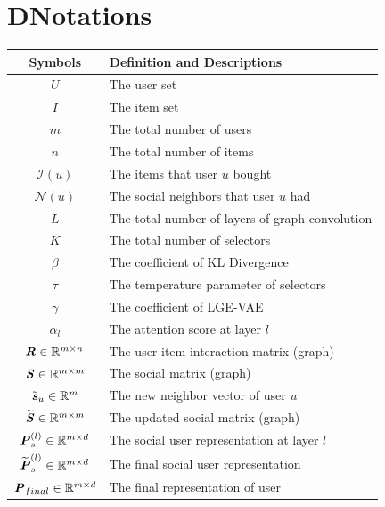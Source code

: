 \documentclass[letterpaper]{article} %
\begin{document}
\section{D{\quad}Notations}
\begin{table}[ht]
    \centering
    \begin{tabular}{c|p{6.0cm}}
        \hline
         Symbols &Definition and Descriptions \\ \hline\hline
         $U$    &The user set\\ \hline
         $I$    &The item set\\ \hline
         $m$    &The total number of users\\ \hline
         $n$    &The total number of items\\ \hline
         $\mathcal{I}(u)$   &The items that user $u$ bought\\ \hline
         $\mathcal{N}(u)$   &The social neighbors that user $u$ had\\ \hline
         $L$    &The total number of layers of graph convolution\\ \hline
         $K$    &The total number of selectors\\ \hline
         $\beta$    &The coefficient of KL Divergence\\ \hline
         $\tau$ &The temperature parameter of selectors\\ \hline
         $\gamma$   &The coefficient of LGE-VAE\\ \hline
         $\alpha_l$ &The attention score at layer $l$\\ \hline
         $\textbf{\textit{R}}\in \mathbb{R}^{m\times n}$  &The user-item interaction matrix (graph)\\ \hline
         $\textbf{\textit{S}}\in \mathbb{R}^{m\times m}$  &The social matrix (graph)\\ \hline
         $\tilde{\textbf{\textit{s}}}_u \in \mathbb{R}^{m}$ &The new neighbor vector of user $u$\\ \hline
         $\widetilde{\textbf{\textit{S}}}\in \mathbb{R}^{m\times m}$ &The updated social matrix (graph)\\ \hline
         $\textbf{\textit{P}}^{(l)}_{s}\in \mathbb{R}^{m\times d}$    &The social user representation at layer $l$\\ \hline
         $\widetilde{\textbf{\textit{P}}}^{(l)}_{s}\in \mathbb{R}^{m\times d}$    &The final social user representation\\ \hline
         $\textbf{\textit{P}}_{final}\in \mathbb{R}^{m\times d}$    &The final representation of user\\ \hline

\end{tabular}
\end{table}
\end{document}
